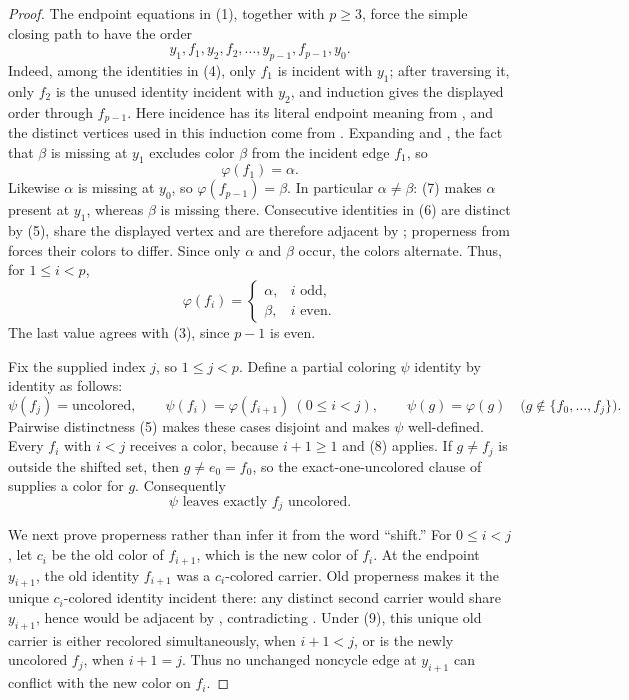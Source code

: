 \begin{proof}
The endpoint equations in (1), together with $p\geq3$, force the simple
closing path to have the order
\[
 y_1,f_1,y_2,f_2,\ldots,y_{p-1},f_{p-1},y_0.                    \tag{6}
\]
Indeed, among the identities in (4), only $f_1$ is incident with $y_1$;
after traversing it, only $f_2$ is the unused identity incident with
$y_2$, and induction gives the displayed order through $f_{p-1}$.
Here incidence has its literal endpoint meaning from
, and the distinct vertices used in this induction
come from .  Expanding
 and , the fact that
$\beta$ is missing at $y_1$ excludes color $\beta$ from the incident
edge $f_1$, so
\[
                         \varphi(f_1)=\alpha.                    \tag{7}
\]
Likewise $\alpha$ is missing at $y_0$, so
$\varphi(f_{p-1})=\beta$.  In particular $\alpha\ne\beta$: (7) makes
$\alpha$ present at $y_1$, whereas $\beta$ is missing there.  Consecutive
identities in (6) are distinct by (5), share the displayed vertex and
are therefore adjacent by ; properness from
 forces their colors to differ.  Since
only $\alpha$ and $\beta$ occur, the colors alternate.  Thus, for
$1\leq i<p$,
\[
 \varphi(f_i)=
 \begin{cases}
  \alpha,&i\text{ odd},\\
  \beta,&i\text{ even}.
 \end{cases}                                                     \tag{8}
\]
The last value agrees with (3), since $p-1$ is even.

Fix the supplied index $j$, so $1\leq j<p$.  Define a partial coloring
$\psi$ identity by identity as follows:
\[
 \psi(f_j)=\mathrm{uncolored},\qquad
 \psi(f_i)=\varphi(f_{i+1})\ (0\leq i<j),\qquad
 \psi(g)=\varphi(g)\quad
   \bigl(g\notin\{f_0,\ldots,f_j\}\bigr).                       \tag{9}
\]
Pairwise distinctness (5) makes these cases disjoint and makes $\psi$
well-defined.  Every $f_i$ with $i<j$ receives a color, because
$i+1\geq1$ and (8) applies.  If $g\ne f_j$ is outside the shifted set,
then $g\ne e_0=f_0$, so the exact-one-uncolored clause of
 supplies a color for $g$.  Consequently
\[
                    \psi\text{ leaves exactly }f_j\text{ uncolored}. \tag{10}
\]

We next prove properness rather than infer it from the word ``shift.''
For $0\leq i<j$, let $c_i$ be the old color of $f_{i+1}$, which is the
new color of $f_i$.  At the endpoint $y_{i+1}$, the old identity
$f_{i+1}$ was a $c_i$-colored carrier.  Old properness makes it the unique
$c_i$-colored identity incident there: any distinct second carrier would
share $y_{i+1}$, hence would be adjacent by
, contradicting
.  Under (9), this unique old carrier is
either recolored simultaneously, when $i+1<j$, or is the newly uncolored
$f_j$, when $i+1=j$.  Thus no unchanged noncycle edge at $y_{i+1}$ can
conflict with the new color on $f_i$.


\end{proof}

